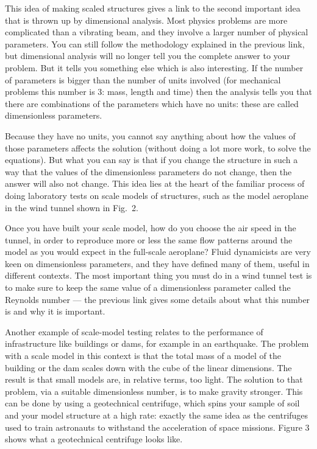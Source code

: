   This idea of making scaled structures gives a link to the second important 
  idea that is thrown up by dimensional analysis. Most physics problems are 
  more complicated than a vibrating beam, and they involve a larger number of 
  physical parameters. You can still follow the methodology explained in the 
  previous link, but dimensional analysis will no longer tell you the complete 
  answer to your problem. But it tells you something else which is also 
  interesting. If the number of parameters is bigger than the number of units 
  involved (for mechanical problems this number is 3: mass, length and time) 
  then the analysis tells you that there are combinations of the parameters 
  which have no units: these are called dimensionless parameters. 

  Because they have no units, you cannot say anything about how the values of 
  those parameters affects the solution (without doing a lot more work, to 
  solve the equations). But what you can say is that if you change the 
  structure in such a way that the values of the dimensionless parameters do 
  not change, then the answer will also not change. This idea lies at the heart 
  of the familiar process of doing laboratory tests on scale models of 
  structures, such as the model aeroplane in the wind tunnel shown in Fig.\ 2. 

  Once you have built your scale model, how do you choose the air speed in the 
  tunnel, in order to reproduce more or less the same flow patterns around the 
  model as you would expect in the full-scale aeroplane? Fluid dynamicists are 
  very keen on dimensionless parameters, and they have defined many of them, 
  useful in different contexts. The most important thing you must do in a wind 
  tunnel test is to make sure to keep the same value of a dimensionless 
  parameter called the Reynolds number — the previous link gives some details 
  about what this number is and why it is important. 

  Another example of scale-model testing relates to the performance of 
  infrastructure like buildings or dams, for example in an earthquake. The 
  problem with a scale model in this context is that the total mass of a model 
  of the building or the dam scales down with the cube of the linear 
  dimensions. The result is that small models are, in relative terms, too 
  light. The solution to that problem, via a suitable dimensionless number, is 
  to make gravity stronger. This can be done by using a geotechnical 
  centrifuge, which spins your sample of soil and your model structure at a 
  high rate: exactly the same idea as the centrifuges used to train astronauts 
  to withstand the acceleration of space missions. Figure 3 shows what a 
  geotechnical centrifuge looks like. 

